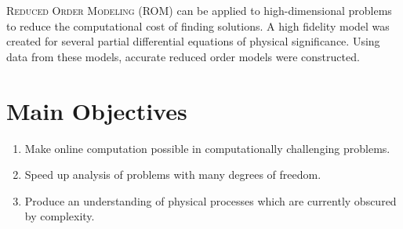 \documentclass{a0poster}
\makeatletter
\renewenvironment{abstract}{%
    \if@twocolumn
      \section*{\abstractname}%
    \else %
      \begin{center}%
        {\bfseries \LARGE\abstractname\vspace{\z@}}%
      \end{center}%
      \quotation
    \fi}
    {\if@twocolumn\else\endquotation\fi}
\makeatother
\begin{document}
\begin{multicols}{3} %


\color{Navy} %

\hrulefill
\vspace{0.5cm}
\begin{abstract}
\LARGE

\textsc{Reduced Order Modeling} (ROM) can be applied to high-dimensional problems to reduce the computational cost of finding solutions. A high fidelity model was created for several partial differential equations of physical significance. Using data from these models, accurate reduced order models were constructed.

\end{abstract}
\hrulefill


\color{Black} %

\section{Main Objectives}
\LARGE
\begin{enumerate}
\item Make online computation possible in computationally challenging problems.
\item Speed up analysis of problems with many degrees of freedom.
\item Produce an understanding of physical processes which are currently obscured by complexity.
\end{enumerate}


\end{multicols}
\end{document}

